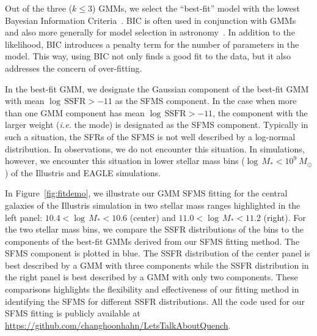 \documentclass[preprint2,tighten]{aastex62}
\begin{document}
Out of the three ($k\leq3$) GMMs, we select the ``best-fit'' model with the lowest Bayesian Information 
Criteria~\citep[BIC;][]{schwarz1978}. BIC is often used in conjunction with 
GMMs~\citep[\emph{e.g.}][]{leroux1992,roeder1997,fraley1998,steele2010performance} 
and also more generally for model selection in 
astronomy~\citep[\emph{e.g.}][]{liddle2007,broderick2011,vakili2016}.
In addition to the likelihood, BIC introduces a penalty term for the number
of parameters in the model. This way, using BIC not only finds a good fit to 
the data, but it also addresses the concern of over-fitting. 

In the best-fit GMM, we designate the Gaussian component of the 
best-fit GMM with mean $\log\,\mathrm{SSFR} > −11$ as the SFMS component.
In the case when more than one GMM component has mean 
$\log\,\mathrm{SSFR} > −11$, the component with the larger weight 
(\emph{i.e.} the mode) is designated as the SFMS component. Typically in such a 
situation, the SFRs of the SFMS is not well described by a log-normal
distribution. In observations, we do not encounter this situation. 
In simulations, however, we encounter this situation in lower stellar mass bins 
($\log\,M_* < 10^{9}\ M_\odot$) of the Illustris and EAGLE simulations. 

In Figure~\ref{fig:fitdemo}, we illustrate our GMM SFMS fitting for the 
central galaxies of the Illustris simulation in two stellar mass 
ranges highlighted in the left panel: $10.4 < \log\,M_* < 10.6$ (center) 
and $11.0 < \log\,M_* < 11.2$ (right). For the two stellar mass bins, 
we compare the SSFR distributions of the bins to the components of the 
best-fit GMMs derived from our SFMS fitting method. The SFMS component 
is plotted in blue. The SSFR distribution of the center panel is best 
described by a GMM with three components while the SSFR distribution 
in the right  panel is best described by a GMM with only two components.
These comparisons highlights the flexibility and effectiveness 
of our fitting method in identifying the SFMS for different SSFR 
distributions. All the code used for our SFMS fitting is publicly available 
at \url{https://github.com/changhoonhahn/LetsTalkAboutQuench}.
\end{document}
